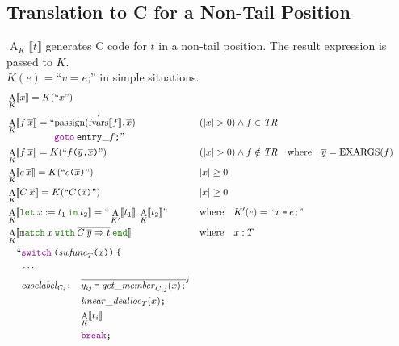 \documentclass[a4paper,fleqn]{article}
\newcommand{\kwlet}{\mbox{\color{mygreen}\ttfamily let}}
\newcommand{\kwin}{\mbox{\color{mygreen}\ttfamily in}}
\newcommand{\kwmatch}{\mbox{\color{mygreen}\ttfamily match}}
\newcommand{\kwwith}{\mbox{\color{mygreen}\ttfamily with}}
\newcommand{\kwend}{\mbox{\color{mygreen}\ttfamily end}}
\newcommand{\letin}[3]{\kwlet\:#1:=#2\:\kwin\:#3}
\newcommand{\omatch}[2]{\kwmatch\:#1\:\kwwith\:{#2}\:\kwend}
\DeclareMathOperator{\EXARGS}{EXARGS}
\newcommand{\BRA}[1]{\llbracket #1 \rrbracket}
\newcommand{\tr}{\mathit{TR}}
\newcommand{\ldq}{\text{``}}
\newcommand{\rdq}{\text{''}}
\newcommand{\dq}[1]{\text{``}#1\text{''}}
\newcommand{\ttparen}[1]{\texttt{(}#1\texttt{)}}
\newcommand{\ttlbrace}{\texttt{\char '173}}
\newcommand{\tteq}{\texttt{=}}
\newcommand{\ttsemi}{\texttt{;}}
\newcommand{\ttcomma}{\texttt{,}}
\newcommand{\ttcolon}{\texttt{:}}
\newcommand{\kwswitch}{\mbox{\color{myviolet}\ttfamily switch}}
\newcommand{\kwbreak}{\mbox{\color{myviolet}\ttfamily break}}
\newcommand{\kwgoto}{\mbox{\color{myviolet}\ttfamily goto}}
\DeclareMathOperator{\passign}{passign}
\DeclareMathOperator{\fvarsop}{fvars}
\newcommand{\fvarsd}[1]{\fvarsop'\BRA{#1}}
\DeclareMathOperator{\Aop}{A}
\newcommand{\A}[2]{\Aop_{#1}\BRA{#2}}
\newcommand{\rep}[1]{\overline{#1}}
\newcommand{\repi}[2]{\overline{#1}^{#2}}
\begin{document}
\subsection{Translation to C for a Non-Tail Position}\label{sec:AK}
$\A{K}{t}$ generates C code for $t$ in a non-tail position.
The result expression is passed to $K$. \\
$K(e) = \dq{v = e\ttsemi}$ in simple situations.
\begin{align*}
  &\A{K}{x} = K(\dq{x}) \\
  &\A{K}{f\:\rep{x}} =
      \begin{aligned}[t] \ldq & {\passign(\fvarsd{f}, \rep{x})} \\ & \kwgoto\:\mathtt{entry\_}f\ttsemi \rdq \end{aligned}
    && \begin{aligned}[t] & (|x| > 0) \wedge f \in \tr \end{aligned} \\
  &\A{K}{f\:\rep{x}} = K(\dq{f\ttparen{\rep{y}\ttcomma \rep{x}}})
    && \begin{aligned}[t] & (|x| > 0) \wedge f \notin \tr \quad \text{where} \quad \rep{y} = \EXARGS(f) \end{aligned} \\
      &\A{K}{c\:\rep{x}} = K(\dq{c\ttparen{\rep{x}}})                                   && |x| \geq 0 \\
  &\A{K}{C\:\rep{x}} = K(\dq{C\ttparen{\rep{x}}})                                   && |x| \geq 0 \\
  &\A{K}{\letin{x}{t_1}{t_2}} = \ldq \A{K'}{t_1}\; \A{K}{t_2} \rdq
    && \text{where}\quad K'(e) = \dq{x\:\tteq\:e\ttsemi} \\
  &\A{K}{\omatch{x}{\rep{C\:\rep{y}\Rightarrow t}}} && \text{where}\quad x : T \\
     & \quad\begin{alignedat}{2}
       \ldq & \kwswitch\:\ttparen{\mathit{swfunc}_T\ttparen{x}}\:\ttlbrace \\
            & \cdots \\
            & \mathit{caselabel}_{C_i}\ttcolon\quad
              \begin{aligned}[t]
              & \repi{y_{ij}\:\tteq\:\mathit{get\_member}_{C_i j}(x)\ttsemi}{j} \\
              & \mathit{linear\_dealloc}_{T}(x)\ttsemi \\
              & {\A{K}{t_i}} \\
              & \kwbreak\ttsemi
              \end{aligned} \\

\end{alignedat}
\end{align*}
\end{document}

